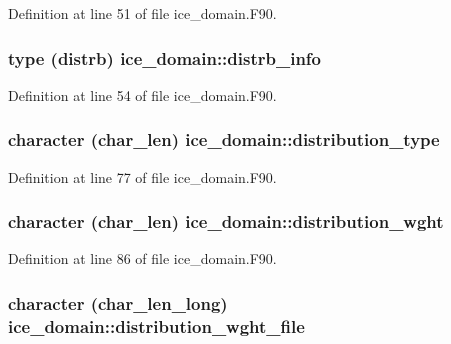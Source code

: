 Definition at line 51 of file ice\_\-domain.F90.\hypertarget{namespaceice__domain_af84e6e4ee8c3c2d04326e26048f003b1}{
\subsubsection[{distrb\_\-info}]{\setlength{\rightskip}{0pt plus 5cm}type ({\bf distrb}) {\bf ice\_\-domain::distrb\_\-info}}}
\label{namespaceice__domain_af84e6e4ee8c3c2d04326e26048f003b1}


Definition at line 54 of file ice\_\-domain.F90.\hypertarget{namespaceice__domain_a9c80809a4e6a48707a7ef1f2eb795ea5}{
\subsubsection[{distribution\_\-type}]{\setlength{\rightskip}{0pt plus 5cm}character (char\_\-len) {\bf ice\_\-domain::distribution\_\-type}}}
\label{namespaceice__domain_a9c80809a4e6a48707a7ef1f2eb795ea5}


Definition at line 77 of file ice\_\-domain.F90.\hypertarget{namespaceice__domain_a89743a68c52b19112e09ab35a820ff26}{
\subsubsection[{distribution\_\-wght}]{\setlength{\rightskip}{0pt plus 5cm}character (char\_\-len) {\bf ice\_\-domain::distribution\_\-wght}}}
\label{namespaceice__domain_a89743a68c52b19112e09ab35a820ff26}


Definition at line 86 of file ice\_\-domain.F90.\hypertarget{namespaceice__domain_a010eb9c42e0d853d313f922f3ddecf93}{
\subsubsection[{distribution\_\-wght\_\-file}]{\setlength{\rightskip}{0pt plus 5cm}character (char\_\-len\_\-long) {\bf ice\_\-domain::distribution\_\-wght\_\-file}}}
\label{namespaceice__domain_a010eb9c42e0d853d313f922f3ddecf93}



